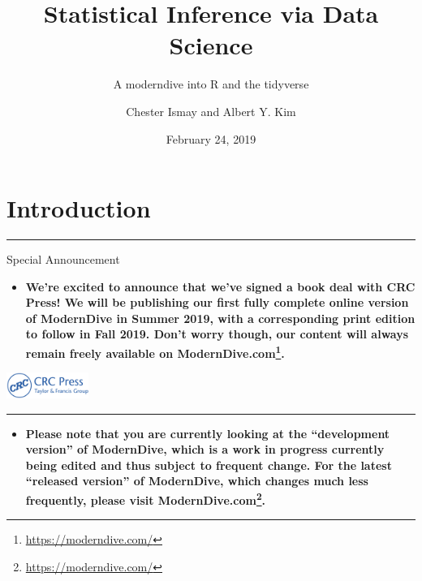 \documentclass[12pt, krantz2,]{krantz}
\title{Statistical Inference via Data Science}
\subtitle{A moderndive into R and the tidyverse}
\author{Chester Ismay and Albert Y. Kim}
\date{February 24, 2019}
\renewcommand{\href}[2]{#2\footnote{\url{#1}}}
\newenvironment{rmdblock}[1]
  {\begin{shaded*}
  \begin{itemize}
  \renewcommand{\labelitemi}{
    \raisebox{-.7\height}[0pt][0pt]{
    }
  }
  \item
  }
  {
  \end{itemize}
  \end{shaded*}
  }
\newenvironment{learncheck}
  {\begin{rmdblock}{warning}}
  {\end{rmdblock}}
\newenvironment{announcement}
  {\begin{rmdblock}{warning}}
  {\end{rmdblock}}
\begin{document}
\maketitle


\thispagestyle{empty}

\begin{center}
\end{center}

\setlength{\abovedisplayskip}{-5pt}
\setlength{\abovedisplayshortskip}{-5pt}

{
\hypersetup{linkcolor=}
\setcounter{tocdepth}{2}
\tableofcontents
}
\listoftables
\listoffigures
\mainmatter

\hypertarget{intro}{%
\chapter{Introduction}\label{intro}}

\begin{center}\rule{0.5\linewidth}{\linethickness}\end{center}

Special Announcement

\begin{announcement}
\textbf{We're excited to announce that we've signed a book deal with CRC
Press! We will be publishing our first fully complete online version of
ModernDive in Summer 2019, with a corresponding print edition to follow
in Fall 2019. Don't worry though, our content will always remain freely
available on \href{https://moderndive.com/}{ModernDive.com}.}
\end{announcement}

\includegraphics[width=0.2\textwidth,height=\textheight]{images/crc_press.jpg}

\begin{center}\rule{0.5\linewidth}{\linethickness}\end{center}

\begin{learncheck}
\textbf{Please note that you are currently looking at the ``development
version'' of ModernDive, which is a work in progress currently being
edited and thus subject to frequent change. For the latest ``released
version'' of ModernDive, which changes much less frequently, please
visit \href{https://moderndive.com/}{ModernDive.com}.}
\end{learncheck}
\end{document}
